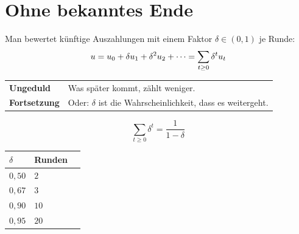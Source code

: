 \section{Ohne bekanntes Ende}

\begin{merksatz}
Man bewertet künftige Auszahlungen mit einem Faktor $\delta \in (0,1)$ je Runde:
\[ u = u_0 + \delta u_1 + \delta^{2} u_2 + \cdots = \sum_{t\ge0} \delta^{t} u_t \]

\begin{center}
{\small
\renewcommand{\arraystretch}{1.5}
\begin{tabular}{@{}P{2.4cm}P{6.2cm}@{}}
\toprule
\textbf{Ungeduld} & Was später kommt, zählt weniger.\\
\textbf{Fortsetzung} & Oder: $\delta$ ist die Wahrscheinlichkeit, dass es weitergeht.\\
\bottomrule
\end{tabular}}
\end{center}

\begin{center}
\begin{minipage}{0.88\textwidth}
\end{minipage}
\end{center}

\[ \sum_{t\ge0}\delta^{t} = \frac{1}{1-\delta} \]

\begin{center}
{\small
\renewcommand{\arraystretch}{1.48}
\begin{tabular}{@{}P{1.8cm}P{2.4cm}P{2.4cm}@{}}
\toprule
$\delta$ & \textbf{Runden} & \\
\midrule
$0{,}50$ & $2$ & \\
$0{,}67$ & $3$ & \\
$0{,}90$ & $10$ & \\
$0{,}95$ & $20$ & \\
\bottomrule
\end{tabular}}
\end{center}
\end{merksatz}

